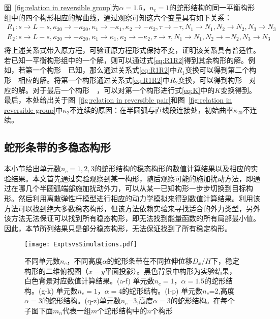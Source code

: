 图~\ref{fig:relation in reversible group}为$\alpha=1.5$，$n_c=1$的蛇形结构的同一平衡构形组中的四个构形相应的解曲线，通过观察可知这六个变量具有如下关系：
\begin{equation}
	\begin{gathered}
		R_{1}: s \rightarrow L-s, \kappa_{20} \rightarrow-\kappa_{20}, \kappa_{1} \rightarrow-\kappa_{1}, \kappa_{2} \rightarrow-\kappa_{2}, \tau \rightarrow-\tau, N_{1} \rightarrow N_{1}, N_{2} \rightarrow N_{2}, N_{3} \rightarrow N_{3} \\
		R_{2}: s \rightarrow L-s, \kappa_{20} \rightarrow-\kappa_{20}, \kappa_{1} \rightarrow \kappa_{1}, \kappa_{2} \rightarrow-\kappa_{2}, \tau \rightarrow \tau, N_{1} \rightarrow N_{1}, N_{2} \rightarrow-N_{2}, N_{3} \rightarrow N_{3} \\
	\end{gathered}
	\label{eq:R1R2}
\end{equation}
将上述关系式带入原方程，可验证原方程形式保持不变，证明该关系具有普适性。若已知一平衡构形组中的一个解，则可以通过式\eqref{eq:R1R2}得到其余构形的解。例如，若第一个构形~\Brighttriangle~已知，那么通过关系式\eqref{eq:R1R2}中$R_1$变换可以得到第二个构形~\Rlefttriangle~相应的解。将第一个构形通过关系式\eqref{eq:R1R2}中$R_2$变换，可以得到构形~\Blefttriangle~对应的解。对于最后一个构形~\Rrighttriangle~，可以对第一个构形进行式\eqref{eq:K}中的$K$变换得到。最后，本处给出关于图~\ref{fig:relation in reversible pair}和图~\ref{fig:relation in reversible group}中$\kappa_2$不连续的原因：在半圆弧与直线段连接处，初始曲率$\kappa_{20}$不连续。
\subsection{蛇形条带的多稳态构形}
本小节给出单元数$n_c=1,2,3$的蛇形结构的稳态构形的数值计算结果以及相应的实验结果。本文首先通过实验观察到某一构形，随后观察可能的施加扰动方法，即通过在哪几个半圆弧端部施加扰动外力，可以从某一已知构形一步步切换到目标构形。然后利用离散弹性杆模型进行相应的动力学模拟来得到数值计算结果。利用该方法可以找到绝大多数稳态构形，但该方法依赖实验来寻找适合的外力类型，另外该方法无法保证可以找到所有稳态构形，即无法找到能量函数的所有局部最小值。因此，本节所列结果只是部分稳态构形，无法保证找到了所有稳定构形。
\begin{figure}[t]
	\centering
	\texttt{[image: ExptsvsSimulations.pdf]}
	\caption{不同单元数$n_c$，不同高度$\alpha$的蛇形条带在不同拉伸位移$D_x/H$下，稳定构形的二维俯视图（$x-y$平面投影）。黑色背景中构形为实验结果，白色背景对应数值计算结果。(a-f) 单元数$n_c=1$，$\alpha=1.5$的蛇形结构。(g-k) 单元数$n_c=1$，$\alpha=4$的蛇形结构。(l-p) 单元数$n_c$=2,高度$\alpha=3$的蛇形结构。(q-z)单元数$n_c$=3,高度$\alpha=3$的蛇形结构。在每个子图下面$m_n$代表一组$m$个蛇形结构中的$n$个构形}
	\label{fig:ExptsvsSimulations}
\end{figure}

